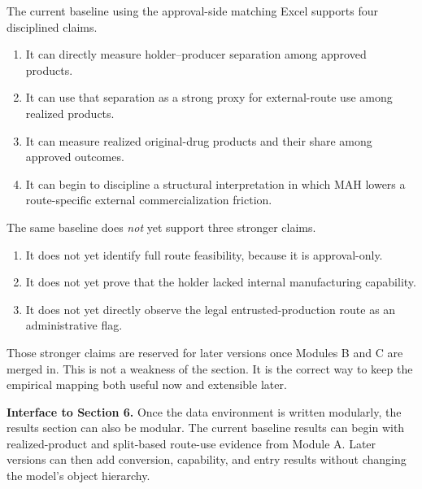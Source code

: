 \documentclass[12pt]{article}
\begin{document}
The current baseline using the approval-side matching Excel supports four disciplined claims.

\begin{enumerate}
\item It can directly measure holder--producer separation among approved products.
\item It can use that separation as a strong proxy for external-route use among realized products.
\item It can measure realized original-drug products and their share among approved outcomes.
\item It can begin to discipline a structural interpretation in which MAH lowers a route-specific
external commercialization friction.
\end{enumerate}

The same baseline does \emph{not} yet support three stronger claims.

\begin{enumerate}
\item It does not yet identify full route feasibility, because it is approval-only.
\item It does not yet prove that the holder lacked internal manufacturing capability.
\item It does not yet directly observe the legal entrusted-production route as an administrative flag.
\end{enumerate}

Those stronger claims are reserved for later versions once Modules B and C are merged in. This is
not a weakness of the section. It is the correct way to keep the empirical mapping both useful now
and extensible later.

\textbf{Interface to Section 6.} Once the data environment is written modularly, the results section
can also be modular. The current baseline results can begin with realized-product and split-based
route-use evidence from Module A. Later versions can then add conversion, capability, and entry
results without changing the model's object hierarchy.



\end{document}
